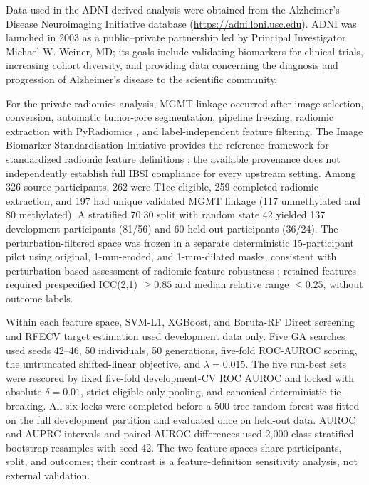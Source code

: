 Data used in the ADNI-derived analysis were obtained from the Alzheimer's Disease Neuroimaging Initiative database (\url{https://adni.loni.usc.edu}). ADNI was launched in 2003 as a public--private partnership led by Principal Investigator Michael W. Weiner, MD; its goals include validating biomarkers for clinical trials, increasing cohort diversity, and providing data concerning the diagnosis and progression of Alzheimer's disease to the scientific community.



For the private radiomics analysis, MGMT linkage occurred after image selection, conversion, automatic tumor-core segmentation, pipeline freezing, radiomic extraction with PyRadiomics \citep{ref43}, and label-independent feature filtering. The Image Biomarker Standardisation Initiative provides the reference framework for standardized radiomic feature definitions \citep{ref42}; the available provenance does not independently establish full IBSI compliance for every upstream setting. Among 326 source participants, 262 were T1ce eligible, 259 completed radiomic extraction, and 197 had unique validated MGMT linkage (117 unmethylated and 80 methylated). A stratified 70:30 split with random state 42 yielded 137 development participants (81/56) and 60 held-out participants (36/24). The perturbation-filtered space was frozen in a separate deterministic 15-participant pilot using original, 1-mm-eroded, and 1-mm-dilated masks, consistent with perturbation-based assessment of radiomic-feature robustness \citep{ref41}; retained features required prespecified ICC(2,1) \(\geq0.85\) and median relative range \(\leq0.25\), without outcome labels.

Within each feature space, SVM-L1, XGBoost, and Boruta-RF Direct screening and RFECV target estimation used development data only. Five GA searches used seeds 42--46, 50 individuals, 50 generations, five-fold ROC-AUROC scoring, the untruncated shifted-linear objective, and \(\lambda=0.015\). The five run-best sets were rescored by fixed five-fold development-CV ROC AUROC and locked with absolute \(\delta=0.01\), strict eligible-only pooling, and canonical deterministic tie-breaking. All six locks were completed before a 500-tree random forest was fitted on the full development partition and evaluated once on held-out data. AUROC and AUPRC intervals and paired AUROC differences used 2,000 class-stratified bootstrap resamples with seed 42. The two feature spaces share participants, split, and outcomes; their contrast is a feature-definition sensitivity analysis, not external validation.

